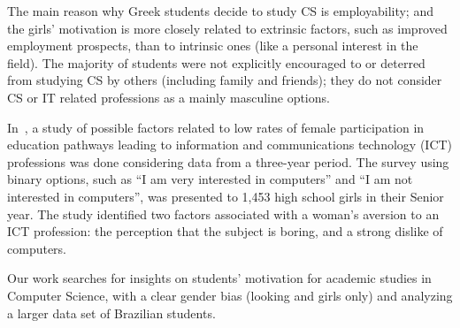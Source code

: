 The main reason why Greek students decide to study CS is employability; and the girls' motivation is more closely related to extrinsic factors, such as improved employment prospects, than to intrinsic ones (like a personal interest in the field). The majority of students were not explicitly encouraged to or deterred from studying CS by others (including family and friends); they do not consider CS or IT related professions as a mainly masculine options.

In~\cite{anderson_because_2008}, a study of possible factors related to low rates of female participation in education pathways leading to information and communications technology (ICT) professions was done considering data from a three-year period. The survey using binary options, such as ``I am very interested in computers'' and ``I am not interested in computers'', was presented to 1,453 high school girls in their Senior year. The study identified two factors associated with a woman's aversion to an ICT profession: the perception that the subject is boring, and a strong dislike of computers.


Our work searches for insights on students' motivation for academic studies in Computer Science, with a clear gender bias (looking and girls only) and analyzing a larger data set of Brazilian students.
